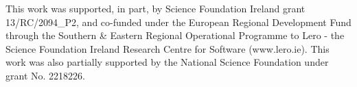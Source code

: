 \documentclass[manuscript]{acmart}
\begin{document}
\begin{acks}
    This work was supported, in part, by Science Foundation Ireland grant 13/RC/2094\_P2, and co-funded under the European Regional Development Fund through the Southern \& Eastern Regional Operational Programme to Lero - the Science Foundation Ireland Research Centre for Software (www.lero.ie). This work was also partially supported by the National Science Foundation under grant No. 2218226. 
\end{acks}




\appendix
\end{document}
